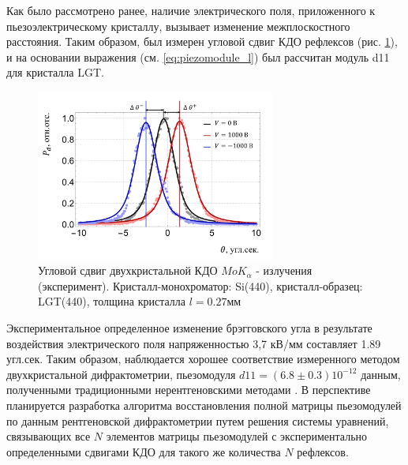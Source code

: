 Как было рассмотрено ранее, наличие электрического поля, приложенного
к пьезоэлектрическому кристаллу, вызывает изменение межплоскостного расстояния.
Таким образом, был измерен угловой сдвиг КДО рефлексов (рис. \ref{ris:d11_experiment}), и на основании выражения
 (см. \ref{eq:piezomodule_l}) был рассчитан модуль d11 для кристалла LGT.

\begin{figure}[H]
  \centering
  \includegraphics[width=0.7\textwidth]{images/peak_shift_1000v.png}
  \caption{Угловой сдвиг двухкристальной КДО $MoK_{\alpha}$ - излучения (эксперимент). Кристалл-монохроматор: Si(440),
  кристалл-образец: LGT(440), толщина кристалла $l = 0.27мм$ }
  \label{ris:d11_experiment}
\end{figure}

Экспериментальное определенное изменение брэгговского угла в результате воздействия
электрического поля напряженностью 3,7 кВ/мм составляет 1.89 угл.сек. Таким образом,
наблюдается хорошее соответствие измеренного методом двухкристальной дифрактометрии,
 пьезомодуля $d11 = (6.8 \pm 0.3 ) 10^{-12}$ данным, полученными традиционными
  нерентгеновскими методами \cite{LGT_piezo_d11}. В перспективе
  планируется разработка алгоритма восстановления полной матрицы пьезомодулей
  по данным рентгеновской дифрактометрии путем решения системы уравнений, связывающих все $N$
  элементов матрицы пьезомодулей с экспериментально определенными сдвигами КДО для
  такого же количества $N$ рефлексов.

